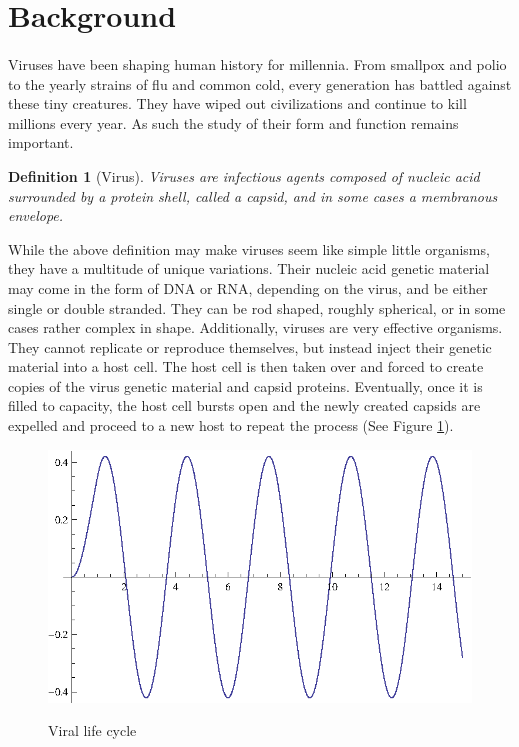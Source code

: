 \documentclass[12pt,letter]{article}
\newtheorem*{definition*}{Definition}
\begin{document}
\section{Background} %

\paragraph{}
Viruses have been shaping human history for millennia. From smallpox and polio to the yearly strains of flu and common cold, every generation has battled against these tiny creatures. They have wiped out civilizations and continue to kill millions every year. As such the study of their form and function remains important.

\begin{definition*}[Virus]
Viruses are infectious agents composed of nucleic acid surrounded by a protein shell, called a capsid, and in some cases a membranous envelope. 
\end{definition*}
While the above definition may make viruses seem like simple little organisms, they have a multitude of unique variations. Their nucleic acid genetic material may come in the form of DNA or RNA, depending on the virus, and be either single or double stranded. They can be rod shaped, roughly spherical, or in some cases rather complex in shape. Additionally, viruses are very effective organisms. They cannot replicate or reproduce themselves, but instead inject their genetic material into a host cell. The host cell is then taken over and forced to create copies of the virus genetic material and capsid proteins. Eventually, once it is filled to capacity, the host cell bursts open and the newly created capsids are expelled and proceed to a new host to repeat the process (See Figure \ref{fig:life_cycle}). \cite{Campbell:2002}

\begin{figure}[h]
	\caption{Viral life cycle}
	\centering
	\includegraphics{place_holder.eps}
	\label{fig:life_cycle}
\end{figure}
	
\end{document}
